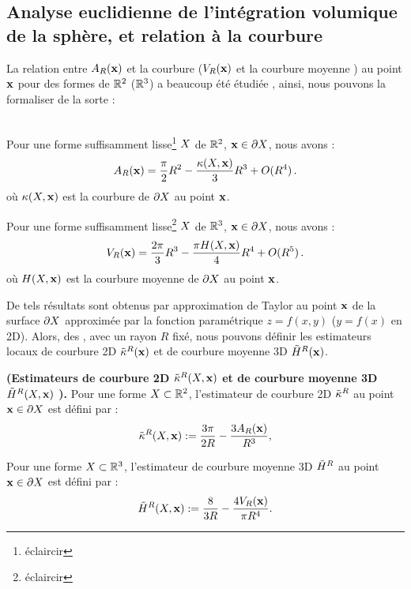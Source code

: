\subsection{Analyse euclidienne de l'intégration volumique de la sphère, et relation à la courbure}
%
La relation entre $A_R(\mathbf{x})$ et la courbure (\resp $V_R(\mathbf{x})$ et la courbure
moyenne ) au point $\mathbf{x}$ pour des formes de $\mathbb{R}^2$ (\respp $\mathbb{R}^3$) a beaucoup
été étudiée \cite{Bullard1995,Pottmann2007,Pottmann2009}, ainsi, nous pouvons la
formaliser de la sorte :
%
\begin{lemma}{\textbf{\cite{Pottmann2009}}}\\
\label{lem:pottmann-2d}
  Pour une forme suffisamment lisse\footnote{éclaircir} $X$ de $\mathbb{R}^2$, $\mathbf{x}
  \in \partial X$, nous avons :
  \begin{equation}
    \label{eq:volume2d}
    A_R(\mathbf{x}) = \frac{\pi}{2} R^2 - \frac{\kappa(X,\mathbf{x})}{3}R^3 + O(R^4)\,.
  \end{equation}
  où $\kappa(X,\mathbf{x})$ est la courbure de $\partial X$ au point $\mathbf{x}$.

  Pour une forme suffisamment lisse\footnote{éclaircir} $X$ de $\mathbb{R}^3$, $\mathbf{x}
  \in \partial X$, nous avons :
  \begin{equation}
    \label{eq:volume3d}
    V_R(\mathbf{x}) = \frac{2\pi}{3} R^3 - \frac{\pi H(X,\mathbf{x})}{4}R^4 + O(R^5)\,.
  \end{equation}
  où $H(X,\mathbf{x})$ est la courbure moyenne de $\partial X$ au point $\mathbf{x}$.
\end{lemma}
%
De tels résultats sont obtenus par approximation de Taylor au point $\mathbf{x}$ de la
surface $\partial X$ approximée par la fonction paramétrique $z=f(x,y)$ ($y=f(x)$ en
2D). Alors, des , avec un
rayon $R$ fixé, nous pouvons définir les estimateurs locaux de courbure 2D
$\tilde{\kappa}^{R}(\mathbf{x})$ et de courbure moyenne 3D $\tilde{H}^{R}(\mathbf{x})$.
%
\begin{definition}{\textbf{(Estimateurs de courbure 2D $\tilde{\kappa}^{R}(X,\mathbf{x})$ et de courbure moyenne 3D $\tilde{H}^{R}(X,\mathbf{x})$ \cite{Pottmann2007}).}}
  \label{def:pottmann-2d-3d-mean}
  Pour une forme $X \subset \mathbb{R}^2$, l'estimateur de courbure 2D $\tilde{\kappa}^{R}$
  au point $\mathbf{x} \in \partial X$ est défini par :
  \begin{equation}
    \label{eq:pottmann-2d}
    \tilde{\kappa}^{R}(X,\mathbf{x}) := \frac{3\pi}{2 R} - \frac{3 A_R(\mathbf{x})}{R^3},
  \end{equation}

  Pour une forme $X \subset \mathbb{R}^3$, l'estimateur de courbure moyenne 3D
  $\tilde{H}^{R}$ au point $\mathbf{x} \in \partial X$ est défini par :
  \begin{equation}
    \label{eq:pottmann-3d-mean}
    \tilde{H}^{R}(X,\mathbf{x}) := \frac{8}{3 R} - \frac{4 V_R(\mathbf{x})}{\pi R^4}.
  \end{equation}
\end{definition}
